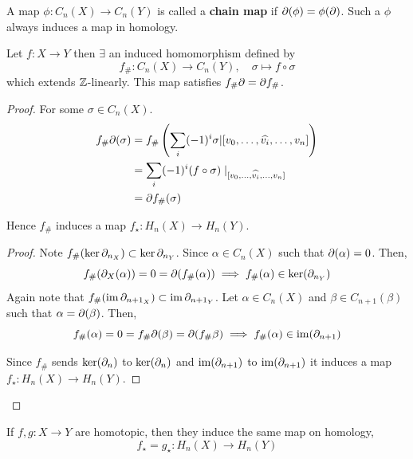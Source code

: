 \documentclass[12pt]{amsart}
\begin{document}
\begin{definition}
    A map $\phi: C_n(X) \to C_n(Y)$ is called a \textbf{chain map} if $\partial(\phi) = \phi(\partial)$. Such a $\phi$ always induces a map in homology. 
\end{definition}

\begin{proposition} 
    Let $f: X \to Y$ then $\exists$ an induced homomorphism defined by 
    \[f_{\#}: C_n(X) \to C_n(Y), \quad \sigma \mapsto f \circ \sigma\]
    which extends $\mathbb Z$-linearly.  This map satisfies $f_{\#}\partial = \partial f_{\#}$. 
\end{proposition}

\begin{proof}
    For some $\sigma \in C_n(X)$. 
    \begin{align*}
        f_{\#}\partial(\sigma) &= f_{\#} \left(\sum_i (-1)^i \sigma | [v_0, \ldots, \widehat{v_i}, \ldots, v_n]\right) \\ 
        &= \sum_i (-1)^i (f \circ \sigma) \mid_{[v_0, \ldots, \widehat{v_i}, \ldots, v_n]} \\ 
        &= \partial f_{\#} (\sigma)
    \end{align*}

    Hence $f_{\#}$ induces a map $f_\star: H_n(X) \to H_n(Y)$. 
    \begin{proof}
        Note $f_{\#} (\ker \partial_{n_X}) \subset \ker \partial_{n_Y}$. Since $\alpha \in C_n(X)$ such that $\partial(\alpha) = 0$. Then, 
        \[f_{\#}(\partial_X(\alpha)) = 0 = \partial(f_{\#} (\alpha)) \implies f_{\#}(\alpha) \in \ker(\partial_{n_Y})\]
        Again note that $f_{\#} (\operatorname{im} \partial_{{n+1}_X}) \subset \operatorname{im} \partial_{{n+1}_Y}$. Let $\alpha \in C_n(X)$ and $\beta \in C_{n+1}(\beta)$ such that $\alpha = \partial (\beta)$. Then, 
        \[f_{\#}(\alpha) = 0 = f_{\#} \partial (\beta) = \partial(f_{\#}\beta) \implies f_{\#}(\alpha) \in \operatorname{im} (\partial_{n+1})\]

        Since $f_{\#}$ sends $\ker(\partial_n)$ to $\ker(\partial_n)$ and $\operatorname{im}(\partial_{n+1})$ to $\operatorname{im}(\partial_{n+1})$ it induces a map $f_\star: H_n(X) \to H_n(Y)$. 
    \end{proof}
\end{proof}

\begin{theorem}
    If $f, g: X \to Y$ are homotopic, then they induce the same map on homology, 
    \[f_\star = g_\star : H_n(X) \to H_n(Y)\]
\end{theorem}
\end{document}
